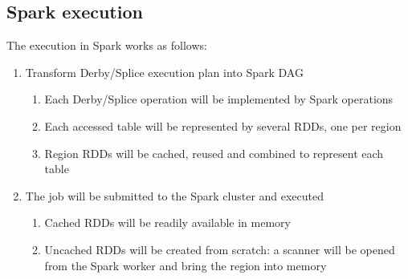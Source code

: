       
\subsection{Spark execution}

The execution in Spark works as follows:

 \begin{enumerate}
	\item Transform Derby/Splice execution plan into Spark DAG
	 \begin{enumerate}
		\item Each Derby/Splice operation will be implemented by Spark operations
		\item Each accessed table will be represented by several RDDs, one per region
		\item Region RDDs will be cached, reused and combined to represent each table
	\end{enumerate}
	\item The job will be submitted to the Spark cluster and executed
	 \begin{enumerate}
		\item Cached RDDs will be readily available in memory
		\item Uncached RDDs will be created from scratch: 
		a scanner will be opened from the Spark worker and bring the region 
		into memory
	\end{enumerate}
\end{enumerate}



